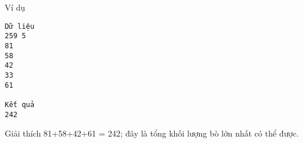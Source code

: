 Ví dụ
\begin{verbatim}
Dữ liệu
259 5
81
58
42
33
61

Kết quả
242
\end{verbatim}
Giải thích
81+58+42+61 = 242; đây là tổng khối lượng bò lớn nhất có thể được.